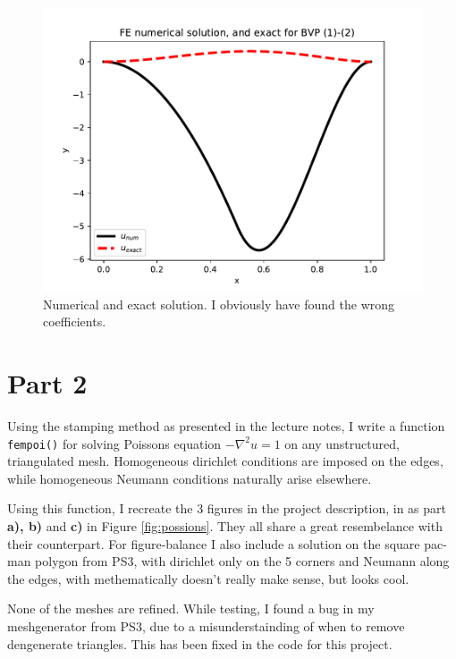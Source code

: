 \documentclass[aps, 12pt]{revtex4}
\begin{document}
\begin{figure}
    \includegraphics[width=\linewidth]{uplot.pdf}
    \caption{Numerical and exact solution. I obviously have found the wrong coefficients.}
    \label{fig:uplot}
\end{figure}

\section*{Part 2}

Using the stamping method as presented in the lecture notes, I write a function \texttt{fempoi()} for solving Poissons equation $-\nabla^2u= 1$ on any unstructured, triangulated mesh. Homogeneous dirichlet conditions are imposed on the edges, while homogeneous Neumann conditions naturally arise elsewhere.

Using this function, I recreate the 3 figures in the project description, in as part \textbf{a), b)} and \textbf{c)} in Figure \ref{fig:possions}. They all share a great resembelance with their counterpart.
For figure-balance I also include a solution on the square pac-man polygon from PS3, with dirichlet only on the 5 corners and Neumann along the edges, with methematically doesn't really make sense, but looks cool.

None of the meshes are refined. While testing, I found a bug in my meshgenerator from PS3, due to a misunderstainding of when to remove dengenerate triangles. This has been fixed in the code for this project.
\end{document}
